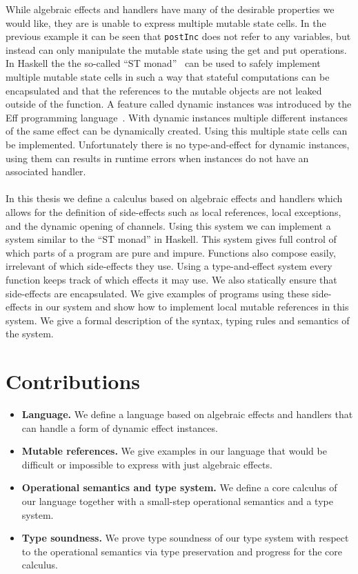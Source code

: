 While algebraic effects and handlers have many of the desirable properties we would like, they are is unable to express multiple mutable state cells.
In the previous example it can be seen that \texttt{postInc} does not refer to any variables, but instead can only manipulate the mutable state using the get and put operations.
In Haskell the the so-called ``ST monad''~\cite{runst} can be used to safely implement multiple mutable state cells in such a way that stateful computations can be encapsulated and that the references to the mutable objects are not leaked outside of the function. 
A feature called dynamic instances was introduced by the Eff programming language~\cite{eff1}.
With dynamic instances multiple different instances of the same effect can be dynamically created.
Using this multiple state cells can be implemented.
Unfortunately there is no type-and-effect for dynamic instances, using them can results in runtime errors when instances do not have an associated handler.
\\\\
In this thesis we define a calculus based on algebraic effects and handlers which allows for the definition of side-effects such as local references, local exceptions, and the dynamic opening of channels.
Using this system we can implement a system similar to the ``ST monad'' in Haskell.
This system gives full control of which parts of a program are pure and impure.
Functions also compose easily, irrelevant of which side-effects they use.
Using a type-and-effect system every function keeps track of which effects it may use.
We also statically ensure that side-effects are encapsulated.
We give examples of programs using these side-effects in our system and show how to implement local mutable references in this system.
We give a formal description of the syntax, typing rules and semantics of the system.

\section*{Contributions}
\begin{itemize}

\item \textbf{Language.}
We define a language based on algebraic effects and handlers that can handle a form of dynamic effect instances.

\item \textbf{Mutable references.}
We give examples in our language that would be difficult or impossible to express with just algebraic effects.

\item \textbf{Operational semantics and type system.}
We define a core calculus of our language together with a small-step operational semantics and a type system.

\item \textbf{Type soundness.}
We prove type soundness of our type system with respect to the operational semantics via type preservation and progress for the core calculus.

\end{itemize}

